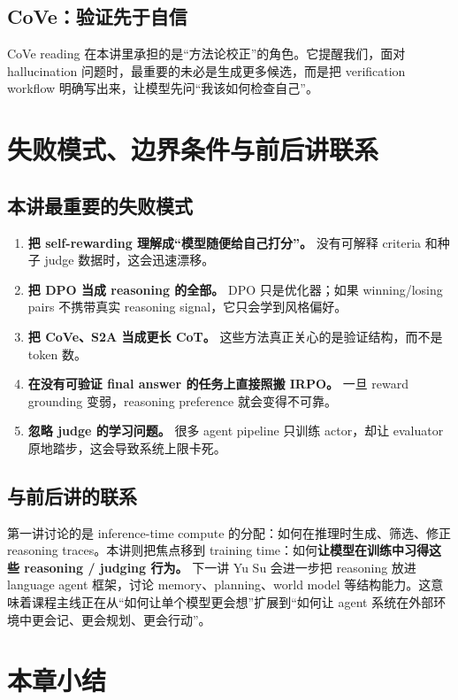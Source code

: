 \documentclass[a4paper]{article}
\begin{document}
\subsection{CoVe：验证先于自信}

CoVe reading 在本讲里承担的是“方法论校正”的角色。它提醒我们，面对 hallucination 问题时，最重要的未必是生成更多候选，而是把 verification workflow 明确写出来，让模型先问“我该如何检查自己”。

\section{失败模式、边界条件与前后讲联系}

\subsection{本讲最重要的失败模式}

\begin{enumerate}
\item \textbf{把 self-rewarding 理解成“模型随便给自己打分”。} 没有可解释 criteria 和种子 judge 数据时，这会迅速漂移。
\item \textbf{把 DPO 当成 reasoning 的全部。} DPO 只是优化器；如果 winning/losing pairs 不携带真实 reasoning signal，它只会学到风格偏好。
\item \textbf{把 CoVe、S2A 当成更长 CoT。} 这些方法真正关心的是验证结构，而不是 token 数。
\item \textbf{在没有可验证 final answer 的任务上直接照搬 IRPO。} 一旦 reward grounding 变弱，reasoning preference 就会变得不可靠。
\item \textbf{忽略 judge 的学习问题。} 很多 agent pipeline 只训练 actor，却让 evaluator 原地踏步，这会导致系统上限卡死。
\end{enumerate}

\subsection{与前后讲的联系}

第一讲讨论的是 inference-time compute 的分配：如何在推理时生成、筛选、修正 reasoning traces。本讲则把焦点移到 training time：如何\textbf{让模型在训练中习得这些 reasoning / judging 行为。} 下一讲 Yu Su 会进一步把 reasoning 放进 language agent 框架，讨论 memory、planning、world model 等结构能力。这意味着课程主线正在从“如何让单个模型更会想”扩展到“如何让 agent 系统在外部环境中更会记、更会规划、更会行动”。

\section{本章小结}
\end{document}
